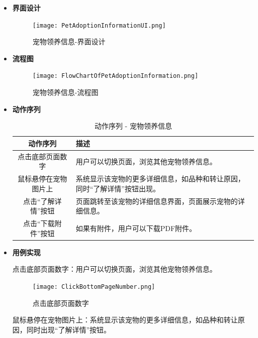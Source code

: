 \begin{itemize}
	\item[] \textbf{界面设计}
	
	\begin{figure}[H]
		\centering
		\texttt{[image: PetAdoptionInformationUI.png]} 
		\caption{宠物领养信息-界面设计}
		\label{fig:Pet adoption information UI}
	\end{figure}
	
	\item[] \textbf{流程图}
	
	\begin{figure}[H]
		\centering
		\texttt{[image: FlowChartOfPetAdoptionInformation.png]} 
		\caption{宠物领养信息-流程图}
		\label{fig:Flow chart of pet adoption information}
	\end{figure}
	
	\item[] \textbf{动作序列}
	
	\begin{table}[H]
		\centering
		\caption{动作序列 - 宠物领养信息}
		\renewcommand\arraystretch{1.5}
		\begin{tabular}{|c|>{\raggedright\arraybackslash}p{7cm}|}
			\hline
			\textbf{动作序列} & \textbf{描述} \\ \hline
			点击底部页面数字 & 用户可以切换页面，浏览其他宠物领养信息。 \\ \hline
			鼠标悬停在宠物图片上 & 系统显示该宠物的更多详细信息，如品种和转让原因，同时“了解详情”按钮出现。 \\ \hline
			点击“了解详情”按钮 & 页面跳转至该宠物的详细信息界面，页面展示宠物的详细信息。 \\ \hline
			点击“下载附件”按钮 & 如果有附件，用户可以下载PDF附件。 \\ \hline
		\end{tabular}
		\label{table:adoption-info-sequence}
	\end{table}
	
	\item[] \textbf{用例实现}
	
	点击底部页面数字：用户可以切换页面，浏览其他宠物领养信息。
	
	\begin{figure}[H]
		\centering
		\texttt{[image: ClickBottomPageNumber.png]} 
		\caption{点击底部页面数字}
		\label{fig:Click bottom page number}
	\end{figure}
	
	鼠标悬停在宠物图片上：系统显示该宠物的更多详细信息，如品种和转让原因，同时出现“了解详情”按钮。
	

\end{itemize}
